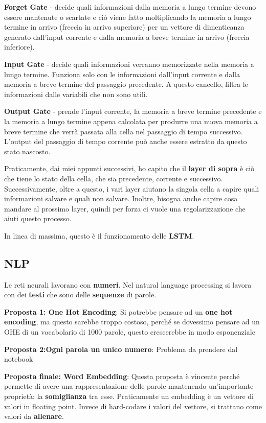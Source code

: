 \textbf{Forget Gate} - decide quali informazioni dalla memoria a lungo termine devono
essere mantenute o scartate e ciò viene fatto moltiplicando la memoria a lungo
termine in arrivo (freccia in arrivo superiore) per un vettore di dimenticanza
generato dall'input corrente e dalla memoria a breve termine in arrivo (freccia
inferiore).

\textbf{Input Gate} - decide quali informazioni verranno memorizzate nella memoria a
lungo termine. Funziona solo con le informazioni dall'input corrente e dalla
memoria a breve termine del passaggio precedente. A questo cancello, filtra le
informazioni dalle variabili che non sono utili.

\textbf{Output Gate} - prende l'input corrente, la memoria a breve termine precedente e
la memoria a lungo termine appena calcolata per produrre una nuova memoria a
breve termine che verrà passata alla cella nel passaggio di tempo successivo.
L'output del passaggio di tempo corrente può anche essere estratto da questo
stato nascosto. 

Praticamente, dai miei appunti successivi, ho capito che il \textbf{layer di sopra} è ciò che
tiene lo stato della cella, che sia precedente, corrente e successivo. Successivamente, oltre a questo, 
i vari layer aiutano la singola cella a capire quali informazioni salvare e quali non salvare. Inoltre, bisogna 
anche capire cosa mandare al prossimo layer, quindi per forza ci vuole una regolarizzazione 
che aiuti questo processo.

In linea di massima, questo è il funzionamento delle \textbf{LSTM}.


\subsection{NLP}

Le reti neurali lavorano con \textbf{numeri}. Nel natural language processing
si lavora con dei \textbf{testi} che sono delle \textbf{sequenze} di parole.

\textbf{Proposta 1: One Hot Encoding}:
Si potrebbe pensare ad un \textbf{one hot encoding}, ma questo sarebbe troppo
costoso, perché se dovessimo pensare ad un OHE di un vocabolario di 1000 parole,
questo crescerebbe in modo esponenziale

\textbf{Proposta 2:Ogni parola un unico numero}:
Problema da prendere dal notebook

\textbf{Proposta finale: Word Embedding}: Questa proposta è vincente perché permette di avere
una rappresentazione delle parole mantenendo un'importante proprietà: la \textbf{somiglianza} tra esse. Praticamente
un embedding è un vettore di valori in floating point. Invece di hard-codare i valori del vettore, si
trattano come valori da \textbf{allenare}.

